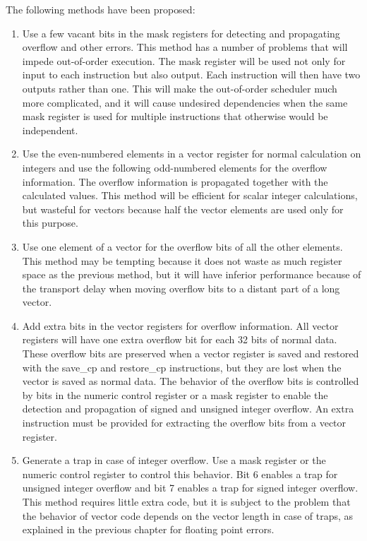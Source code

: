 \documentclass[forwardcom.tex]{subfiles}
\begin{document}
The following methods have been proposed:

\begin{enumerate}
\item Use a few vacant bits in the mask registers for detecting and propagating overflow and other errors. This method has a number of problems that will impede out-of-order execution. The mask register will be used not only for input to each instruction but also output. Each instruction will then have two outputs rather than one. This will make the out-of-order scheduler much more complicated, and it will cause undesired dependencies when the same mask register is used for multiple instructions that otherwise would be independent.

\item Use the even-numbered elements in a vector register for normal calculation on integers 
and use the following odd-numbered elements for the overflow information. The overflow
information is propagated together with the calculated values. 
This method will be efficient for scalar integer calculations, but wasteful for vectors because half the vector elements are used only for this purpose. 

\item Use one element of a vector for the overflow bits of all the other elements. This method may be tempting because it does not waste as much register space as the previous method, but it will have inferior performance because of the transport delay when moving overflow bits to a distant part of a long vector.

\item Add extra bits in the vector registers for overflow information. All vector registers will have one extra overflow bit for each 32 bits of normal data. These overflow bits are preserved when a vector register is saved and restored with the save\_cp and restore\_cp instructions, but they are lost when the vector is saved as normal data. The behavior of the overflow bits is controlled by bits in the numeric control register or a mask register to enable the detection and propagation of signed and unsigned integer overflow.
An extra instruction must be provided for extracting the overflow bits from a vector register.

\item Generate a trap in case of integer overflow. Use a mask register or the numeric control register to control this behavior. Bit 6 enables a trap for unsigned integer overflow and bit 7 enables a trap for signed integer overflow. This method requires little extra code, but it is subject to the problem that the behavior of vector code depends on the vector length in case of traps, as explained in the previous chapter for floating point errors.
\end{enumerate}
\end{document}
